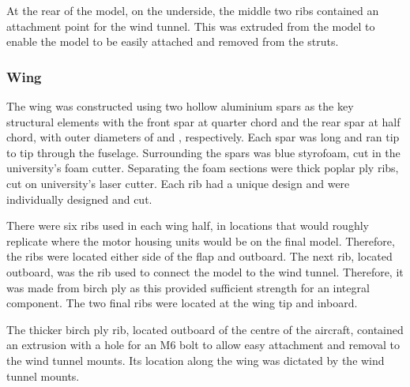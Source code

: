 \documentclass[../../main.tex]{subfiles}
\begin{document}

At the rear of the model, on the underside, the middle two ribs contained an attachment point for the wind tunnel.
This was extruded from the model to enable the model to be easily attached and removed from the struts. 


\subsubsection{Wing} \label{sec:design-process:interim-design-review:wind-tunnel-test:wing}

The wing was constructed using two hollow aluminium spars as the key structural elements with the front spar at quarter chord and the rear spar at half chord, with outer diameters of  and , respectively.
Each spar was  long and ran tip to tip through the fuselage.
Surrounding the spars was blue styrofoam, cut in the university's foam cutter.
Separating the foam sections were  thick poplar ply ribs, cut on university's laser cutter.
Each rib had a unique design and were individually designed and cut.


There were six ribs used in each wing half, in locations that would roughly replicate where the motor housing units would be on the final model.
Therefore, the ribs were located either side of the flap and  outboard.
The next rib, located  outboard, was the rib used to connect the model to the wind tunnel.
Therefore, it was made from  birch ply as this provided sufficient strength for an integral component.
The two final ribs were located at the wing tip and  inboard.


The thicker birch ply rib, located  outboard of the centre of the aircraft, contained an extrusion with a hole for an M6 bolt to allow easy attachment and removal to the wind tunnel mounts.
Its location along the wing was dictated by the wind tunnel mounts. 
\end{document}
